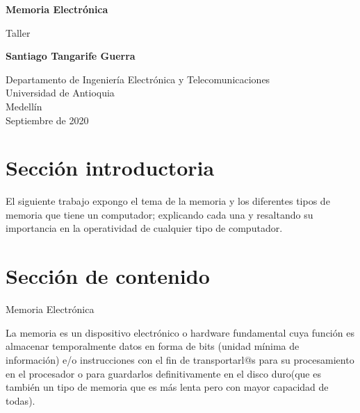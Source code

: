 \documentclass{article}
\begin{document}
\begin{titlepage}
    \begin{center}
        \vspace*{1cm}
        
        \Huge
        \textbf{Memoria Electrónica}
        
        \vspace{0.5cm}
        \LARGE
        Taller
            
        \vspace{1.5cm}
            
        \textbf{Santiago Tangarife Guerra}
            
        \vfill
            
        \vspace{0.8cm}
            
        \Large
        Departamento de Ingeniería Electrónica y Telecomunicaciones\\
        Universidad de Antioquia\\
        Medellín\\
        Septiembre de 2020
            
    \end{center}
\end{titlepage}

\tableofcontents

\section{Sección introductoria}
El siguiente trabajo expongo el tema de la memoria y los diferentes tipos de memoria que tiene un computador; explicando cada una y resaltando su importancia en la operatividad de cualquier tipo de computador.
\section{Sección de contenido} \label{contenido}
    \begin{center}
    \LARGE
        Memoria Electrónica
    \end{center}
    
La memoria es un dispositivo electrónico o hardware fundamental cuya función es almacenar temporalmente datos en forma de bits (unidad mínima de información) e/o instrucciones con el fin de transportarl@s para su procesamiento en el procesador o para guardarlos definitivamente en el disco duro(que es también un tipo de memoria que es más lenta pero con mayor capacidad de todas).
\end{document}
